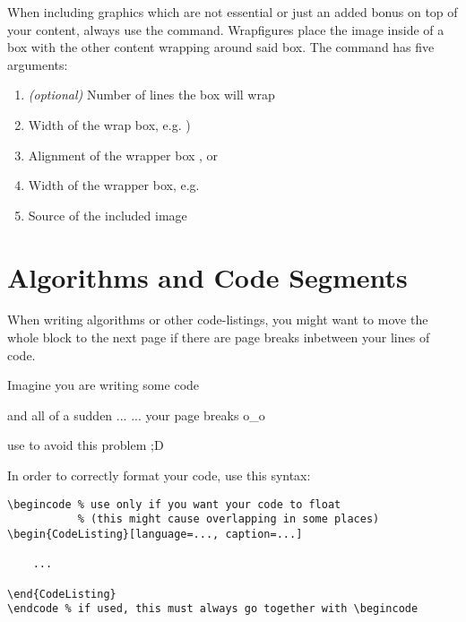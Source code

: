 \documentclass[
    narrow,
    fontstyle=light,
    babelparam=ngerman
]{elite}
\begin{document}
When including graphics which are not essential or just an added bonus on top of your content,
always use the  command. Wrapfigures place the image inside of
a box with the other content wrapping around said box. The  command has
five arguments:
\begin{enumerate}
    \item \textit{(optional)} Number of lines the box will wrap
    \item Width of the wrap box, e.g. )
    \item Alignment of the wrapper box ,  or 
    \item Width of the wrapper box, e.g. 
    \item Source of the included image
\end{enumerate}

\begin{CodeListing}
\end{CodeListing}


\section{Algorithms and Code Segments}
\label{sec:algorithms-and-code-segments}

When writing algorithms or other code-listings, you might want to move the whole block to the
next page if there are page breaks inbetween your lines of code.

\vspace{1em}

\begin{CodeListing}[caption=Code-Listing Positioning]
Imagine you are writing some code

and all of a sudden
...
...
your page breaks o_o

use \filbreak to avoid this problem ;D
\end{CodeListing}

In order to correctly format your code, use this syntax:
\begin{verbatim}
\begincode % use only if you want your code to float
           % (this might cause overlapping in some places)
\begin{CodeListing}[language=..., caption=...]

    ...

\end{CodeListing}
\endcode % if used, this must always go together with \begincode
\end{verbatim}
\end{document}
